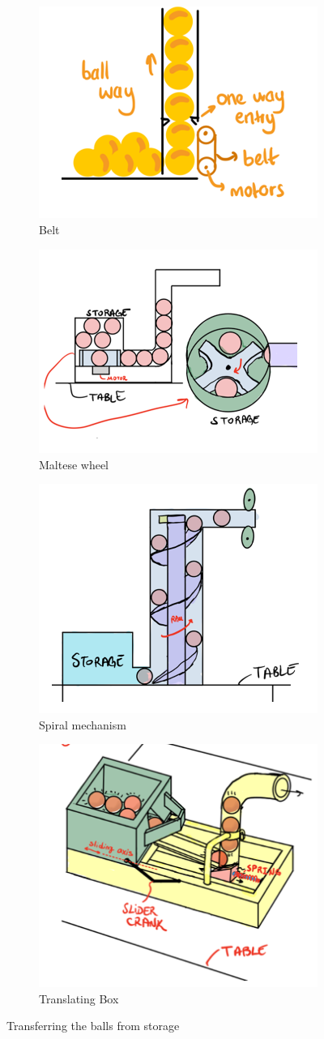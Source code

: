 \documentclass[12pt]{article}
\begin{document}
\begin{figure}[H]
\centering
\begin{subfigure}{.5\textwidth}
  \centering
  \includegraphics[width=.4\linewidth]{Function photos/Belt.png}
  \caption{Belt}
  \label{fig:belt}
\end{subfigure}%
\begin{subfigure}{.5\textwidth}
  \centering
  \includegraphics[width=.4\linewidth]{Function photos/maltese 1.png}
  \caption{Maltese wheel}
  \label{fig:maltese}
\end{subfigure}
\begin{subfigure}{.5\textwidth}
  \centering
  \includegraphics[width=.4\linewidth]{Function photos/spiral.png}
  \caption{Spiral mechanism}
  \label{fig:spiral}
\end{subfigure}%
\begin{subfigure}{.5\textwidth}
  \centering
  \includegraphics[width=.4\linewidth]{Function photos/Translating Box.png}
  \caption{Translating Box}
  \label{fig:translating_box}
\end{subfigure}%
\caption{Transferring the balls from storage }
\label{fig:transferring_storage}
\end{figure}
\end{document}
